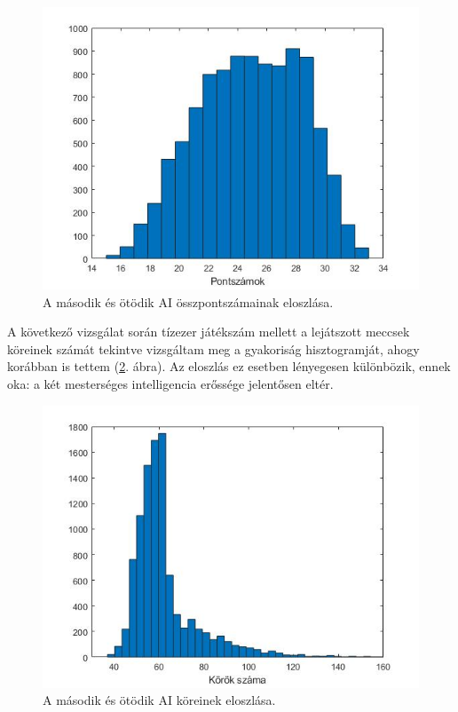 \begin{figure}[H]
\centering
\includegraphics[scale=0.6]{images/final_scores_AI2vsAI5.jpg}
\caption{A második és ötödik AI összpontszámainak eloszlása.}
\label{fig:scores2v5}
\end{figure}

A következő vizsgálat során tízezer játékszám mellett a lejátszott meccsek köreinek számát tekintve vizsgáltam meg a gyakoriság hisztogramját, ahogy korábban is tettem (\ref{fig:rounds2v5}. ábra). Az eloszlás ez esetben lényegesen különbözik, ennek oka: a két mesterséges intelligencia erőssége jelentősen eltér.

\begin{figure}[H]
\centering
\includegraphics[scale=0.6]{images/round_number_hist_AI2vsAI5.jpg}
\caption{A második és ötödik AI köreinek eloszlása.}
\label{fig:rounds2v5}
\end{figure}


